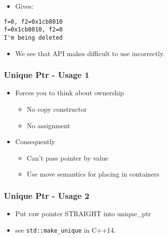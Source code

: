 \begin{itemize}
\itemsep1pt\parskip0pt
\item
  Gives:
\end{itemize}

\begin{verbatim}
f=0, f2=0x1cb8010
f=0x1cb8010, f2=0
I'm being deleted
\end{verbatim}

\begin{itemize}
\itemsep1pt\parskip0pt
\item
  We see that API makes difficult to use incorrectly.
\end{itemize}

\subsubsection{Unique Ptr - Usage 1}\label{unique-ptr---usage-1}

\begin{itemize}
\itemsep1pt\parskip0pt
\item
  Forces you to think about ownership

  \begin{itemize}
  \itemsep1pt\parskip0pt
  \item
    No copy constructor
  \item
    No assignment
  \end{itemize}
\item
  Consequently

  \begin{itemize}
  \itemsep1pt\parskip0pt
  \item
    Can't pass pointer by value
  \item
    Use move semantics for placing in containers
  \end{itemize}
\end{itemize}

\subsubsection{Unique Ptr - Usage 2}\label{unique-ptr---usage-2}

\begin{itemize}
\itemsep1pt\parskip0pt
\item
  Put raw pointer STRAIGHT into unique\_ptr
\item
  see \texttt{std::make\_unique} in C++14.
\end{itemize}

